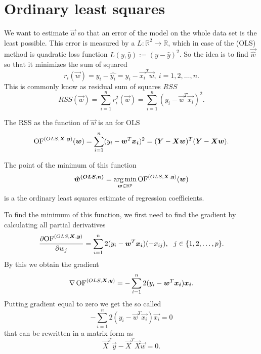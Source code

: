 \section{Ordinary least squares}
We want to estimate $\vec{w}$ so that an error of the model on the whole data set is the least possible. This error is measured by a  
$L : \mathbb{R}^2 \rightarrow  \mathbb{R}$,
which in case of the  (OLS) method is quadratic loss function $L(y, \hat{y}) := (y - \hat{y})^2$. 
So the idea is to find $\vec{\hat{w}}$ so that it minimizes the sum of squared 
\begin{equation}
    r_i(\vec{w}) =y_i - \hat{y_i} = y_i - \vec{x_i}^T\vec{w} ,\ i = 1,2,\ldots ,n.
\end{equation}
This is commonly know as residual sum of squares $RSS$
\begin{equation}
    RSS(\vec{w}) = \sum\limits_{i=1}^n r_i^2(\vec{w}) = \sum\limits_{i=1}^n (y_i - \vec{w}^T\vec{x_i})^2.
\end{equation}
\begin{definition} The RSS as the function of $\vec{w}$ is an  for OLS
    \begin{equation}
        \operatorname{OF}^{(OLS,\boldsymbol{X}, \boldsymbol{y})}(\boldsymbol{w}) = \sum\limits_{i=1}^n (y_i - \boldsymbol{w}^T\boldsymbol{x_i})^2 = (\boldsymbol{Y} - \boldsymbol{X}\boldsymbol{w})^T(\boldsymbol{Y} - \boldsymbol{X}\boldsymbol{w}).
    \end{equation}
\end{definition}
The point of the minimum of this function 
\begin{equation}
\boldsymbol{\hat{w}^{(OLS, n)}}  = \operatorname*{arg\,min}_{\boldsymbol{w} \in \mathbb{R}^p} \operatorname{OF}^{(OLS,\boldsymbol{X}, \boldsymbol{y})}(\boldsymbol{w})
\end{equation}
is a the ordinary least squares estimate of regression coefficients.

To find the minimum of this function, we first need to find the gradient by calculating all partial derivatives
\begin{equation}
    \frac{\partial {\operatorname{OF}^{(OLS,\boldsymbol{X}, \boldsymbol{y})}} }{\partial w_j} = \sum\limits_{i=1}^n 2(y_i - \boldsymbol{w}^T\boldsymbol{x_i})(-x_{ij}) \\, \ \ j \in \{{1,2,\ldots,p\}}. 
\end{equation}
By this we obtain the gradient 
\begin{equation}
    \nabla \operatorname{OF}^{(OLS,\boldsymbol{X}, \boldsymbol{y})} = -\sum\limits_{i=1}^n 2(y_i - \boldsymbol{w}^T\boldsymbol{x_i})\boldsymbol{x_i}. 
\end{equation}
Putting gradient equal to zero we get the so called 
\begin{equation}
    -\sum\limits_{i=1}^n 2(y_i - \vec{w}^T\vec{x_i})\vec{x_i} = 0 
\end{equation}
that can be rewritten in a matrix form as 
\begin{equation}    \label{equation:zerogradient}
    \vec{X}^T\vec{y} - \vec{X}^T\vec{X}\vec{w} = 0.
\end{equation}

